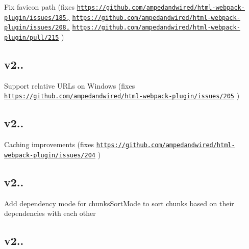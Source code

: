 \begin{DoxyItemize}
\item Fix favicon path (fixes \href{https://github.com/ampedandwired/html-webpack-plugin/issues/185,}{\tt https\+://github.\+com/ampedandwired/html-\/webpack-\/plugin/issues/185,} \href{https://github.com/ampedandwired/html-webpack-plugin/issues/208,}{\tt https\+://github.\+com/ampedandwired/html-\/webpack-\/plugin/issues/208,} \href{https://github.com/ampedandwired/html-webpack-plugin/pull/215}{\tt https\+://github.\+com/ampedandwired/html-\/webpack-\/plugin/pull/215} )
\end{DoxyItemize}

\subsection*{v2.. }


\begin{DoxyItemize}
\item Support relative U\+R\+Ls on Windows (fixes \href{https://github.com/ampedandwired/html-webpack-plugin/issues/205}{\tt https\+://github.\+com/ampedandwired/html-\/webpack-\/plugin/issues/205} )
\end{DoxyItemize}

\subsection*{v2.. }


\begin{DoxyItemize}
\item Caching improvements (fixes \href{https://github.com/ampedandwired/html-webpack-plugin/issues/204}{\tt https\+://github.\+com/ampedandwired/html-\/webpack-\/plugin/issues/204} )
\end{DoxyItemize}

\subsection*{v2.. }


\begin{DoxyItemize}
\item Add {\ttfamily dependency} mode for {\ttfamily chunks\+Sort\+Mode} to sort chunks based on their dependencies with each other
\end{DoxyItemize}

\subsection*{v2.. }


